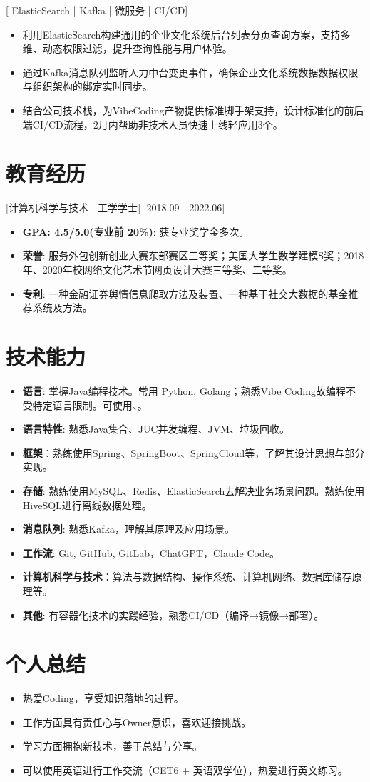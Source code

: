 \documentclass{resume}
\begin{document}
[ \textnormal{ElasticSearch | Kafka | 微服务 | CI/CD}]
\begin{itemize}
  \item 利用ElasticSearch构建通用的企业文化系统后台列表分页查询方案，支持多维、动态权限过滤，提升查询性能与用户体验。
  \item 通过Kafka消息队列监听人力中台变更事件，确保企业文化系统数据数据权限与组织架构的绑定实时同步。
  \item 结合公司技术栈，为VibeCoding产物提供标准脚手架支持，设计标准化的前后端CI/CD流程，2月内帮助非技术人员快速上线轻应用3个。
\end{itemize}

\newpage
\section{教育经历}
[\textnormal{计算机科学与技术 | 工学学士}]
[2018.09—2022.06]
\begin{itemize}
  \item \textbf{GPA: 4.5/5.0(专业前 20\%)}: 获专业奖学金多次。
  \item \textbf{荣誉}: 服务外包创新创业大赛东部赛区三等奖；美国大学生数学建模S奖；2018年、2020年校网络文化艺术节网页设计大赛三等奖、二等奖。
  \item \textbf{专利}: 一种金融证券舆情信息爬取方法及装置、一种基于社交大数据的基金推荐系统及方法。
\end{itemize}

\section[技术能力]{技术能力}
\begin{itemize}
  \item \textbf{语言}: 掌握Java编程技术。常用 Python, Golang；熟悉Vibe Coding故编程不受特定语言限制。可使用、。
  \item \textbf{语言特性}: 熟悉Java集合、JUC并发编程、JVM、垃圾回收。
  \item \textbf{框架}：熟练使用Spring、SpringBoot、SpringCloud等，了解其设计思想与部分实现。
  \item \textbf{存储}: 熟练使用MySQL、Redis、ElasticSearch去解决业务场景问题。熟练使用HiveSQL进行离线数据处理。
  \item \textbf{消息队列}: 熟悉Kafka，理解其原理及应用场景。
  \item \textbf{工作流}: Git, GitHub, GitLab，ChatGPT，Claude Code。
  \item \textbf{计算机科学与技术}：算法与数据结构、操作系统、计算机网络、数据库储存原理等。
  \item \textbf{其他}: 有容器化技术的实践经验，熟悉CI/CD（编译→镜像→部署）。
\end{itemize}

\section{个人总结}

\begin{itemize}
  \item 热爱Coding，享受知识落地的过程。
  \item 工作方面具有责任心与Owner意识，喜欢迎接挑战。
  \item 学习方面拥抱新技术，善于总结与分享。
  \item 可以使用英语进行工作交流（CET6 + 英语双学位），热爱进行英文练习。
\end{itemize}
\end{document}
